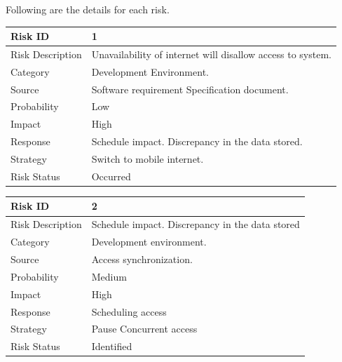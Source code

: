 \documentclass[oneside,a4paper,12pt]{book}
\begin{document}
Following are the details for each risk.
\begin{table}[!htbp]
\begin{center}
\def\arraystretch{1.5}
\begin{tabularx}{\textwidth}{| l | X |}
\hline 
Risk ID	& 1 \\ \hline
Risk Description	& Unavailability of internet will disallow access to system. \\ \hline
Category	& Development Environment. \\ \hline
Source	& Software requirement Specification document. \\ \hline
Probability	& Low \\ \hline
Impact	& High \\ \hline
Response	& Schedule impact. Discrepancy in the data stored. \\ \hline
Strategy	& Switch to mobile internet. \\ \hline
Risk Status	& Occurred \\ \hline
\end{tabularx}
\end{center}
\label{tab:risk1}
\end{table}

\begin{table}[!htbp]
\begin{center}
\def\arraystretch{1.5}
\begin{tabularx}{\textwidth}{| l | X |}
\hline 
Risk ID	& 2 \\ \hline
Risk Description	& Schedule impact. Discrepancy in the data stored \\ \hline
Category	& Development environment. \\ \hline
Source	& Access synchronization. \\ \hline
Probability	& Medium \\ \hline
Impact	& High \\ \hline
Response	& Scheduling access\\ \hline
Strategy	& Pause Concurrent access  \\ \hline
Risk Status	& Identified \\ \hline
\end{tabularx}
\end{center}
\label{tab:risk2}
\end{table}
\end{document}
